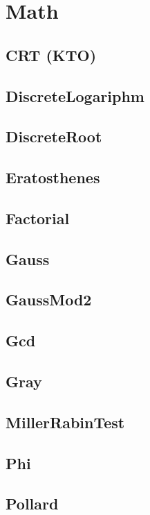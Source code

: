 \section{Math}

\subsection{CRT (KTO)}

\subsection{DiscreteLogariphm}

\subsection{DiscreteRoot}

\subsection{Eratosthenes}

\subsection{Factorial}

\subsection{Gauss}

\subsection{GaussMod2}

\subsection{Gcd}

\subsection{Gray}

\subsection{MillerRabinTest}

\subsection{Phi}

\subsection{Pollard}

